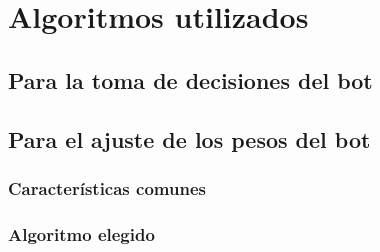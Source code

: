 \chapter{Algoritmos utilizados}


\section{Para la toma de decisiones del bot}


\section{Para el ajuste de los pesos del bot}


\subsection{Características comunes}


\subsection{Algoritmo elegido}